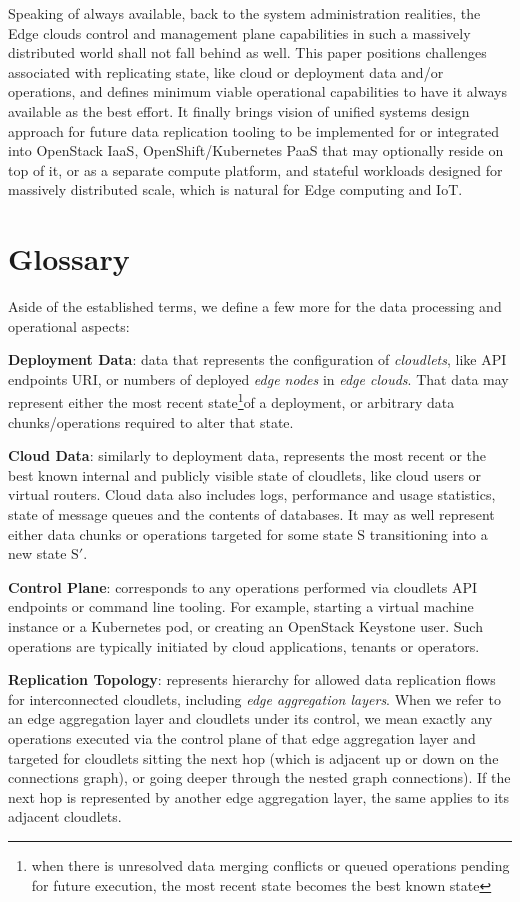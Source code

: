 \documentclass[conference]{IEEEtran}
\begin{document}
Speaking of always available, back to the system administration realities, the
Edge clouds control and management plane capabilities in such a massively
distributed world shall not fall behind as well. This paper positions
challenges associated with replicating state, like cloud or deployment data
and/or operations, and defines minimum viable operational capabilities to have
it always available as the best effort. It finally brings vision of unified
systems design approach for future data replication tooling to be implemented
for or integrated into OpenStack IaaS, OpenShift/Kubernetes PaaS that may
optionally reside on top of it, or as a separate compute platform, and stateful
workloads designed for massively distributed scale, which is natural for Edge
computing and IoT.

\section{Glossary}

Aside of the established terms\cite{b3}, we define a few more for the data
processing and operational aspects:

\textbf{Deployment Data}: data that represents the configuration of
\textit{cloudlets}\cite{b3}, like API endpoints URI, or numbers of deployed
\textit{edge nodes}\cite{b3} in \textit{edge clouds}\cite{b3}. That data may
represent either the most recent state\footnote{when there is unresolved data
merging conflicts or queued operations pending for future execution, the most
recent state becomes the best known state}of a deployment, or arbitrary data
chunks/operations required to alter that state.

\textbf{Cloud Data}: similarly to deployment data, represents the most recent
or the best known internal and publicly visible state of cloudlets, like cloud users or
virtual routers. Cloud data also includes logs, performance and usage
statistics, state of message queues and the contents of databases. It may as
well represent either data chunks or operations targeted for some state
$\mathrm{S}$ transitioning into a new state $\mathrm{S'}$.

\textbf{Control Plane}: corresponds to any operations performed via cloudlets
API endpoints or command line tooling. For example, starting a virtual machine
instance or a Kubernetes pod, or creating an OpenStack Keystone user. Such
operations are typically initiated by cloud applications, tenants or operators.

\textbf{Replication Topology}: represents hierarchy for allowed data
replication flows for interconnected cloudlets, including \textit{edge
aggregation layers}\cite{b3}. When we refer to an edge aggregation layer and
cloudlets under its control, we mean exactly any operations executed via the
control plane of that edge aggregation layer and targeted for cloudlets sitting
the next hop (which is adjacent up or down on the connections graph), or going
deeper through the nested graph connections). If the next hop is represented by
another edge aggregation layer, the same applies to its adjacent cloudlets.
\end{document}

